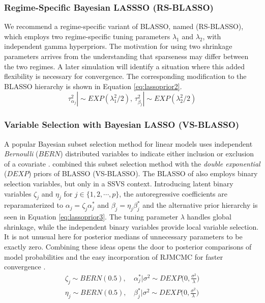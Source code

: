\subsubsection{Regime-Specific Bayesian LASSSO (RS-BLASSO)}
We recommend a regime-specific variant of BLASSO, named (RS-BLASSO), which employs two regime-specific tuning parameters $\lambda_1$ and $\lambda_2$, with independent gamma hyperpriors. The motivation for using two shrinkage parameters arrives from the understanding that sparseness may differ between the two regimes. A later simulation will identify a situation where this added flexibility is necessary for convergence. The corresponding modification to the BLASSO hierarchy is shown in Equation \ref{eq:lassoprior2}. 
\begin{equation}
	\label{eq:lassoprior2}
	 \tau^2_{\alpha_j}| \sim EXP(\lambda_1^2/2) \textrm{,  } \tau^2_{\beta_j}| \sim EXP(\lambda_2^2/2)
\end{equation}

 \subsubsection{Variable Selection with Bayesian LASSO (VS-BLASSO)}
A popular Bayesian subset selection method for linear models uses independent \textit{Bernoulli} ($BERN$) distributed variables to indicate either inclusion or exclusion of a covariate \citep{Kuo1998}. \cite{Lykou2013} combined this subset selection method with the \textit{double exponential} ($DEXP$) priors of BLASSO (VS-BLASSO). The BLASSO of \cite{Yuan2005} also employs binary selection variables, but only in a SSVS context. Introducing latent binary variables $\zeta_j$ and $\eta_j$ for $j \in \{1,2,\cdots, p\}$, the autoregressive coefficients are reparamaterized to $\alpha_j=\zeta_j\alpha_j^*$ and $\beta_j=\eta_j\beta_j^*$ and the alternative prior hierarchy is seen in  Equation \ref{eq:lassoprior3}. The tuning parameter $\lambda$ handles global shrinkage, while the independent binary variables provide local variable selection. It is not unusual here for posterior medians of unnecessary parameters to be exactly zero. Combining these ideas opens the door to posterior comparisons of model probabilities and the easy incorporation of RJMCMC for faster convergence \citep{Dellaportas2002}.
\begin{equation}
\begin{split}
	\label{eq:lassoprior3}
	 \zeta_j \sim BERN(0.5) \textrm{,  } & \alpha_j^*|\sigma^2\sim DEXP\Big(0,\frac{\sigma^2}{\lambda}\Big) \\
	  \eta_j \sim BERN(0.5) \textrm{,  } & \beta_j^*|\sigma^2\sim DEXP\Big(0,\frac{\sigma^2}{\lambda}\Big)
\end{split}
\end{equation}

